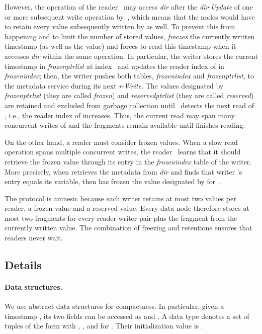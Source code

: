 \documentclass[oribibl]{llncs}
\theoremstyle{definition-boldhead}
\newcommand{\var}[1]{\textit{#1}}
\newcommand{\op}[1]{\textsl{#1}}
\newcommand{\dir}{\var{dir}\xspace}
\newcommand{\node}{node\xspace}
\newcommand{\nodes}{nodes\xspace}
\begin{document}
However, the operation of the reader~ may access \dir after the
\dir-\op{Update} of one or more subsequent write operation by~,
which means that the \nodes would have to retain every value
subsequently written by  as well.  To prevent this from happening
and to limit the number of stored values,  \emph{freezes} the
currently written timestamp (as well as the value) and forces  to
read this timestamp when it accesses \dir within the same operation.
In particular, the writer stores the current timestamp in
\var{frozenptrlist} at index~ and updates the reader index of 
in \var{frozenindex}; then, the writer pushes both tables,
\var{frozenindex} and \var{frozenptrlist}, to the metadata service
during its next \var{r}-\op{Write}. The values designated by
\var{frozenptrlist} (they are called \emph{frozen}) and
\var{reservedptrlist} (they are called \emph{reserved}) are retained
and excluded from garbage collection until~ detects the
next read of , i.e., the reader index of  increases.  Thus, the
current read may span many concurrent writes of  and the fragments
remain available until  finishes reading.



On the other hand, a reader must consider frozen values.  When
a slow read operation spans multiple concurrent writes, the reader~
learns that it should retrieve the frozen value through its entry in
the \var{frozenindex} table of the writer.  More precisely, when 
retrieves the metadata from \dir and finds that writer 's
 entry equals its  variable,
then  has frozen the value designated by 
for~.

The protocol is amnesic because each writer retains at most two values
per reader, a frozen value and a reserved value.  Every data \node
therefore stores at most two fragments for every reader-writer pair
plus the fragment from the currently written value.  The combination
of freezing and retentions ensures that readers never wait.

\subsection{Details}
\label{sec:details}

\paragraph{Data structures.}
We use abstract data structures for compactness.  In particular, given
a timestamp , its two fields can be accessed
as  and .  A data type 
denotes a set of tuples of the form  with , , and  for .
Their initialization value is .
\end{document}
